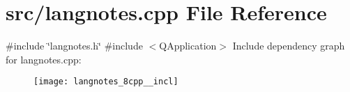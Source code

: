 \section{src/langnotes.cpp File Reference}
\label{langnotes_8cpp}
{\ttfamily \#include \char`\"{}langnotes.\+h\char`\"{}}\newline
{\ttfamily \#include $<$Q\+Application$>$}\newline
Include dependency graph for langnotes.\+cpp\+:\nopagebreak
\begin{figure}[H]
\begin{center}
\leavevmode
\texttt{[image: langnotes\_8cpp\_\_incl]}
\end{center}
\end{figure}
